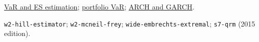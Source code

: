 \begin{qfmethod}
 \hyperref[meth:var-es-estimation-methods]{VaR and ES estimation}; \hyperref[meth:portfolio-var-methods-decomposition]{portfolio VaR}; \hyperref[mod:arch-conditional-variance]{ARCH and GARCH}.

 \nolinkurl{w2-hill-estimator}; \nolinkurl{w2-mcneil-frey}; \nolinkurl{wide-embrechts-extremal}; \nolinkurl{s7-qrm} (2015 edition).

\end{qfmethod}

